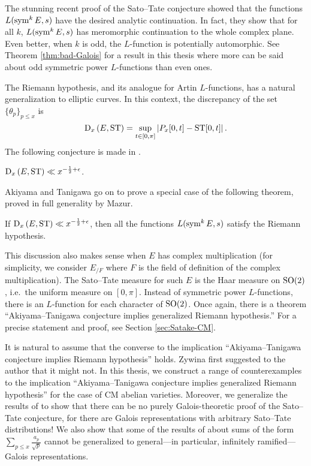 The stunning recent proof of the Sato--Tate conjecture 
\cite{harris-shepherd-barron-taylor-2010} 
showed that the functions $L(\operatorname{sym}^k E,s)$ have the desired analytic 
continuation. In fact, they show that for all $k$, $L(\operatorname{sym}^k E,s)$ has 
meromorphic continuation to the whole complex plane. Even better, when $k$ is 
odd, the $L$-function is potentially automorphic. See Theorem 
\ref{thm:bad-Galois} for a result in this thesis where more can be said about 
odd symmetric power $L$-functions than even ones. 

The Riemann hypothesis, and its analogue for Artin $L$-functions, has a natural 
generalization to elliptic curves. In this context, the discrepancy of the set 
$\{\theta_p\}_{p\leqslant x}$ is 
\[
	\operatorname{D}_x\left(E,\mathrm{ST}\right) = \sup_{t\in [0,\pi]} \left| P_x[0,t] - \mathrm{ST}[0,t]\right| .
\]
The following conjecture is made in \cite{akiyama-tanigawa-1999}.

\begin{conjecture}
$\operatorname{D}_x\left(E,\mathrm{ST}\right)\ll x^{-\frac 1 2+\epsilon}$.
\end{conjecture}

Akiyama and Tanigawa go on to prove a special case of the following theorem, 
proved in full generality by Mazur. 

\begin{theorem}
If $\operatorname{D}_x\left(E,\mathrm{ST}\right)\ll x^{-\frac 1 2+\epsilon}$, 
then all the functions $L(\operatorname{sym}^k E, s)$ satisfy the Riemann hypothesis. 
\end{theorem}

This discussion also makes sense when $E$ has complex multiplication (for 
simplicity, we consider $E_{/F}$ where $F$ is the field of definition of the 
complex multiplication). The Sato--Tate measure for such $E$ is the Haar 
measure on $\operatorname{SO}(2)$, i.e.~the uniform measure on $[0,\pi]$. Instead of 
symmetric power $L$-functions, there is an $L$-function for each character of 
$\operatorname{SO}(2)$. Once again, there is a theorem ``Akiyama--Tanigawa conjecture implies 
generalized Riemann hypothesis.'' For a precise statement and proof, see Section 
\ref{sec:Satake-CM}.

It is natural to assume that the converse to the implication 
``Akiyama--Tanigawa conjecture implies Riemann hypothesis'' holds. Zywina 
first suggested to the author that it might not. In this thesis, we construct a 
range of counterexamples to the implication ``Akiyama--Tanigawa conjecture implies 
generalized Riemann hypothesis'' for the case of CM abelian varieties. 
Moreover, we generalize the results of \cite{pande-2011} to show that there can 
be no purely Galois-theoretic proof of the Sato--Tate conjecture, for there are 
Galois representations with arbitrary Sato--Tate distributions! We also show 
that some of the results of \cite{sarnak-2007} about sums of the form 
$\sum_{p\leqslant x} \frac{a_p}{\sqrt p}$ cannot be generalized to 
general---in particular, infinitely ramified---Galois representations. 
